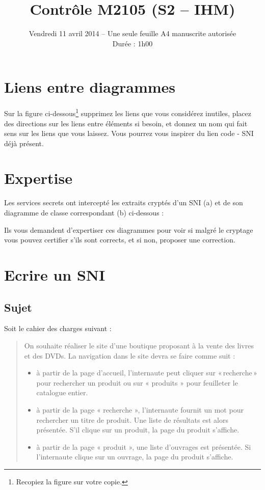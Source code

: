\documentclass[12pt]{article}
\title{\vspace{-3pc}\textbf{Contr\^ole M2105 (S2 -- 	IHM)}}
\date{Vendredi 11 avril 2014 -- Une seule feuille A4 manuscrite autoris\'ee\\
Dur\'ee : 1h00}
\def\dc{\textsf{diagramme de classe}}
\def\sni{\textsf{SNI}}
\begin{document}
\maketitle

\section{Liens entre diagrammes}

Sur la figure ci-dessous\footnote{Recopiez la figure sur votre copie.} supprimez les liens que vous considérez inutiles, placez des directions sur les liens entre éléments si besoin, et donnez un nom qui fait sens sur les liens que vous laissez. Vous pourrez vous inspirer du lien \textsf{code} - \sni{} déjà présent.


\section{Expertise}

Les services secrets ont intercepté les extraits cryptés d'un \sni{} (a) et de son \dc{} correspondant (b) ci-dessous :


Ils vous demandent d'expertiser ces diagrammes pour voir si malgré le cryptage vous pouvez certifier s'ils sont corrects, et si non, proposer une correction.

\section{Ecrire un SNI}

\subsection*{Sujet}

Soit le cahier des charges suivant :

\begin{quote}
On souhaite réaliser le site d'une boutique proposant à la vente des livres et des DVDs. La navigation dans le site devra se faire comme suit :
\begin{itemize}
\item à partir de la page d'accueil, l'internaute peut cliquer sur «\,recherche\,» pour rechercher un produit ou sur
« produits » pour feuilleter le catalogue entier.
\item à partir de la page « recherche », l'internaute fournit un mot pour rechercher un titre de produit. Une liste de résultats est alors présentée. 
S'il clique sur un produit, la page du produit s'affiche.
\item à partir de la page « produit », une liste d'ouvrages est présentée. Si l'internaute clique sur un ouvrage, la page du produit s'affiche.
\end{itemize}
\end{quote}
\end{document}
